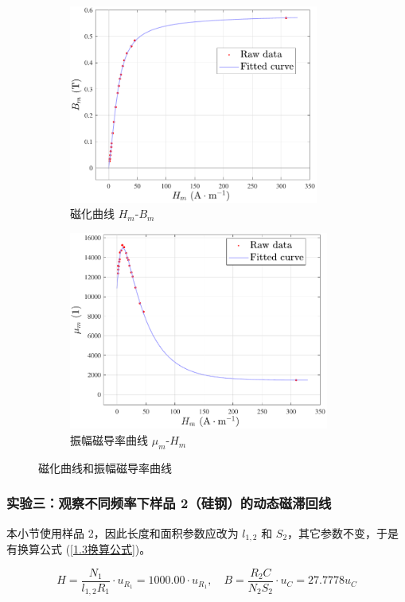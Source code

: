 \documentclass[UTF8]{article}
\theoremstyle{MyLineTheoremStyle} %
\theoremstyle{MyBlockTheoremStyle} %
\theoremstyle{MySubsubsectionStyle} %
\begin{document}
\begin{figure}[H]\centering
\begin{subfigure}[b]{0.5\columnwidth}\centering
    \includegraphics[height=185pt]{assets/1.2/2024-10-28_23-27-43.pdf}
    \caption{磁化曲线 $H_m$-$B_m$}
\end{subfigure}\hfill
\begin{subfigure}[b]{0.5\columnwidth}\centering
    \includegraphics[height=185pt]{assets/1.2/2024-10-28_23-28-14.pdf}
    \caption{振幅磁导率曲线 $\mu_m$-$H_m$}
\end{subfigure}
\caption{磁化曲线和振幅磁导率曲线}\label{1.2图}
\end{figure}


\subsubsection{实验三：观察不同频率下样品 2（硅钢）的动态磁滞回线}\label{不同频率硅钢}
本小节使用样品 2，因此长度和面积参数应改为 $l_{1,2}$ 和 $S_2$，其它参数不变，于是有换算公式 (\ref{1.3换算公式})。

\begin{equation}\label{1.3换算公式}
    H = \frac{N_1}{l_{1, 2}R_1}\cdot u_{R_1} = 1000.00 \cdot u_{R_1},\quad 
    B = \frac{R_2 C}{N_2 S_2}\cdot u_C = 27.7778  u_C
\end{equation}
\end{document}
